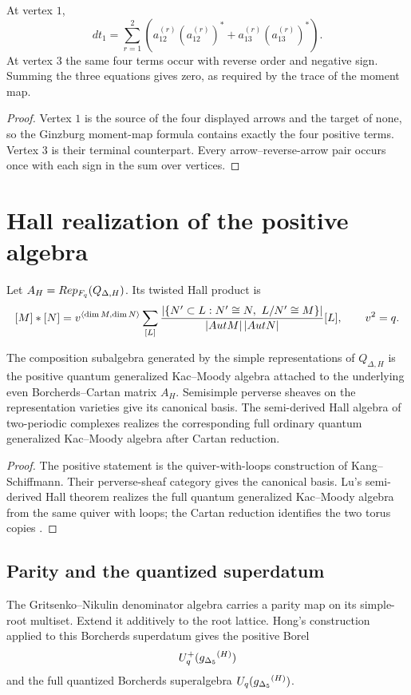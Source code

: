 \begin{calculation}
At vertex $1$,
\[
 d t_1=
 \sum_{r=1}^2
 \left(
 a_{12}^{(r)}(a_{12}^{(r)})^*
 +a_{13}^{(r)}(a_{13}^{(r)})^*
 \right).
\]
At vertex $3$ the same four terms occur with reverse order and negative sign.  Summing the three equations gives zero, as required by the trace of the moment map.
\end{calculation}
\begin{proof}
Vertex $1$ is the source of the four displayed arrows and the target of none, so the Ginzburg moment-map formula contains exactly the four positive terms.  Vertex $3$ is their terminal counterpart.  Every arrow--reverse-arrow pair occurs once with each sign in the sum over vertices.
\end{proof}


\chapter{Hall realization of the positive algebra}
Let $A_H=Rep_{F_q}(Q_{\Delta,H})$.  Its twisted Hall product is
\[
 [M]*[N]
 =v^{\langle \dim M,\dim N\rangle}
 \sum_{[L]}
 \frac{\left|\left\{N'\subset L:N'\cong N,\ L/N'\cong M\right\}\right|}
      {\left|Aut M\right|\left|Aut N\right|}
 [L],
 \qquad v^2=q.
\]

\begin{theorem}
The composition subalgebra generated by the simple representations of $Q_{\Delta,H}$ is the positive quantum generalized Kac--Moody algebra attached to the underlying even Borcherds--Cartan matrix $A_H$.  Semisimple perverse sheaves on the representation varieties give its canonical basis.  The semi-derived Hall algebra of two-periodic complexes realizes the corresponding full ordinary quantum generalized Kac--Moody algebra after Cartan reduction.
\end{theorem}
\begin{proof}
The positive statement is the quiver-with-loops construction of Kang--Schiffmann.  Their perverse-sheaf category gives the canonical basis.  Lu's semi-derived Hall theorem realizes the full quantum generalized Kac--Moody algebra from the same quiver with loops; the Cartan reduction identifies the two torus copies \cite{KangSchiffmann,LuBorcherdsHall,AxtellLee}.
\end{proof}

\section{Parity and the quantized superdatum}
The Gritsenko--Nikulin denominator algebra carries a parity map on its simple-root multiset.  Extend it additively to the root lattice.  Hong's construction applied to this Borcherds superdatum gives the positive Borel
\[
 U_q^+({g_{\Delta_5}}^{(H)})
\]
and the full quantized Borcherds superalgebra $U_q({g_{\Delta_5}}^{(H)})$.

